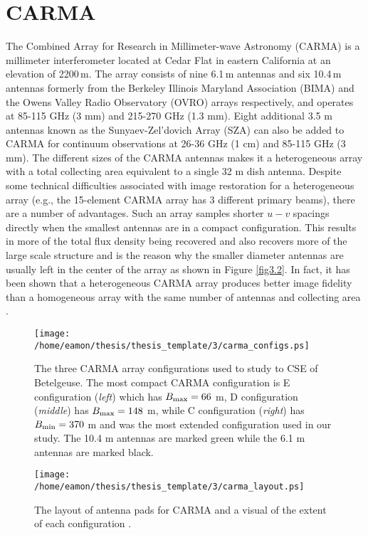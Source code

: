 \section{CARMA}\label{sec:3.2}

The Combined Array for Research in Millimeter-wave Astronomy (CARMA) \citep{bock_2006} is a millimeter interferometer located at Cedar Flat in eastern California at an elevation of 2200\,m. The array consists of nine 6.1\,m antennas and six 10.4\,m antennas formerly from the Berkeley Illinois Maryland Association (BIMA) and the Owens Valley Radio Observatory (OVRO) arrays respectively, and operates at 85-115 GHz (3 mm) and 215-270 GHz (1.3 mm). Eight additional 3.5 m antennas known as the Sunyaev-Zel'dovich Array (SZA) can also be added to CARMA for continuum observations at 26-36 GHz (1 cm) and 85-115 GHz (3 mm). The different sizes of the CARMA antennas makes it a heterogeneous array with a  total collecting area equivalent to a single 32 m dish antenna. Despite some technical difficulties associated with image restoration for a heterogeneous array (e.g., the 15-element CARMA array has 3 different primary beams), there are a number of advantages. Such an array samples shorter $u-v$ spacings directly when the smallest antennas are in a compact configuration. This results in more of the total flux density being recovered and also recovers more of the large scale structure and is the reason why the smaller diameter antennas are usually left in the center of the array as shown in Figure \ref{fig3.2}. In fact, it has been shown that a heterogeneous CARMA array produces better image fidelity than a homogeneous array with the same number of antennas and collecting area \citep{wright_1999}. 

\begin{figure}[!ht]
\centering 
          \texttt{[image: /home/eamon/thesis/thesis\_template/3/carma\_configs.ps]}
\caption[The three CARMA array configurations used.]{The three CARMA array configurations used to study to CSE of Betelgeuse. The most compact CARMA configuration is E configuration (\textit{left}) which has $B_{\rm{max}}=66$ m, D configuration (\textit{middle}) has $B_{\rm{max}}=148$ m, while C configuration (\textit{right}) has $B_{\rm{min}}=370$ m and was the most extended configuration used in our study. The 10.4 m antennas are marked green while the 6.1 m antennas are marked black.}
\label{fig3.2}
\centering 
          \texttt{[image: /home/eamon/thesis/thesis\_template/3/carma\_layout.ps]}
\caption[The layout of antenna pads for CARMA.]{The layout of antenna pads for CARMA and a visual of the extent of each configuration \citep{bock_2006}.}
\label{fig3.3}
\end{figure}


